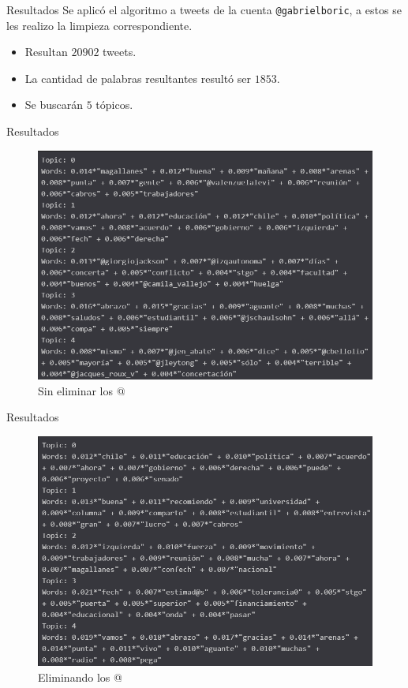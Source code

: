 \documentclass{beamer}
\begin{document}
	\begin{frame}{Resultados}
		Se aplicó el algoritmo a tweets de la cuenta \texttt{@gabrielboric}, a estos se les realizo la limpieza correspondiente.
		
		\begin{itemize}
			\item Resultan $20902$ tweets.
			\item La cantidad de palabras resultantes resultó ser $1853$.
			\item Se buscarán $5$ tópicos.
		\end{itemize}
	\end{frame}

	\begin{frame}{Resultados}
		\begin{figure}[h]
			\includegraphics[scale=.4]{../imgs/segunda_avance/boric_5topics_arroba_hash.png}
			\caption{Sin eliminar los @}
		\end{figure}
	\end{frame}

	\begin{frame}{Resultados}
		\begin{figure}[h]
			\includegraphics[scale=.4]{../imgs/segunda_avance/boric_5topics.png}
			\caption{Eliminando los @}
		\end{figure}
	\end{frame}
\end{document}
